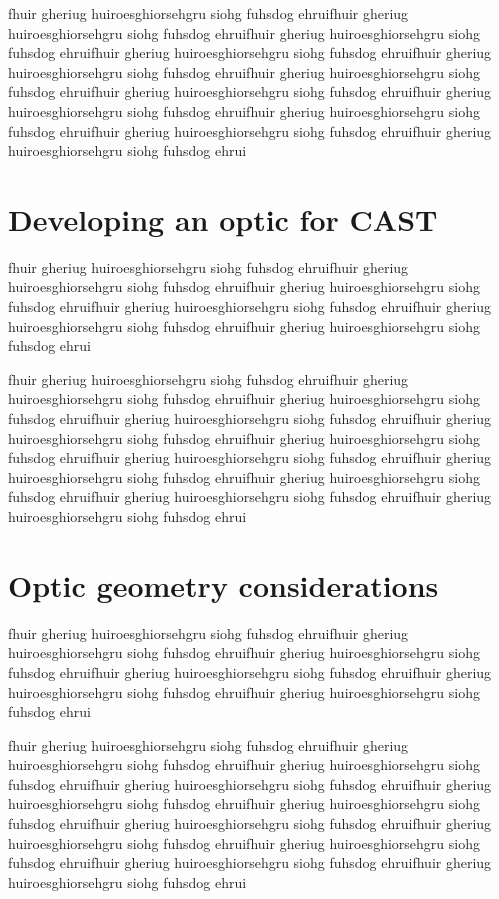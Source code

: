fhuir gheriug huiroesghiorsehgru siohg fuhsdog ehruifhuir gheriug huiroesghiorsehgru siohg fuhsdog ehruifhuir gheriug huiroesghiorsehgru siohg fuhsdog ehruifhuir gheriug huiroesghiorsehgru siohg fuhsdog ehruifhuir gheriug huiroesghiorsehgru siohg fuhsdog ehruifhuir gheriug huiroesghiorsehgru siohg fuhsdog ehruifhuir gheriug huiroesghiorsehgru siohg fuhsdog ehruifhuir gheriug huiroesghiorsehgru siohg fuhsdog ehruifhuir gheriug huiroesghiorsehgru siohg fuhsdog ehruifhuir gheriug huiroesghiorsehgru siohg fuhsdog ehruifhuir gheriug huiroesghiorsehgru siohg fuhsdog ehrui

\section{Developing an optic for CAST}
fhuir gheriug huiroesghiorsehgru siohg fuhsdog ehruifhuir gheriug huiroesghiorsehgru siohg fuhsdog ehruifhuir gheriug huiroesghiorsehgru siohg fuhsdog ehruifhuir gheriug huiroesghiorsehgru siohg fuhsdog ehruifhuir gheriug huiroesghiorsehgru siohg fuhsdog ehruifhuir gheriug huiroesghiorsehgru siohg fuhsdog ehrui

fhuir gheriug huiroesghiorsehgru siohg fuhsdog ehruifhuir gheriug huiroesghiorsehgru siohg fuhsdog ehruifhuir gheriug huiroesghiorsehgru siohg fuhsdog ehruifhuir gheriug huiroesghiorsehgru siohg fuhsdog ehruifhuir gheriug huiroesghiorsehgru siohg fuhsdog ehruifhuir gheriug huiroesghiorsehgru siohg fuhsdog ehruifhuir gheriug huiroesghiorsehgru siohg fuhsdog ehruifhuir gheriug huiroesghiorsehgru siohg fuhsdog ehruifhuir gheriug huiroesghiorsehgru siohg fuhsdog ehruifhuir gheriug huiroesghiorsehgru siohg fuhsdog ehruifhuir gheriug huiroesghiorsehgru siohg fuhsdog ehrui

\section{Optic geometry considerations}
fhuir gheriug huiroesghiorsehgru siohg fuhsdog ehruifhuir gheriug huiroesghiorsehgru siohg fuhsdog ehruifhuir gheriug huiroesghiorsehgru siohg fuhsdog ehruifhuir gheriug huiroesghiorsehgru siohg fuhsdog ehruifhuir gheriug huiroesghiorsehgru siohg fuhsdog ehruifhuir gheriug huiroesghiorsehgru siohg fuhsdog ehrui

fhuir gheriug huiroesghiorsehgru siohg fuhsdog ehruifhuir gheriug huiroesghiorsehgru siohg fuhsdog ehruifhuir gheriug huiroesghiorsehgru siohg fuhsdog ehruifhuir gheriug huiroesghiorsehgru siohg fuhsdog ehruifhuir gheriug huiroesghiorsehgru siohg fuhsdog ehruifhuir gheriug huiroesghiorsehgru siohg fuhsdog ehruifhuir gheriug huiroesghiorsehgru siohg fuhsdog ehruifhuir gheriug huiroesghiorsehgru siohg fuhsdog ehruifhuir gheriug huiroesghiorsehgru siohg fuhsdog ehruifhuir gheriug huiroesghiorsehgru siohg fuhsdog ehruifhuir gheriug huiroesghiorsehgru siohg fuhsdog ehrui

